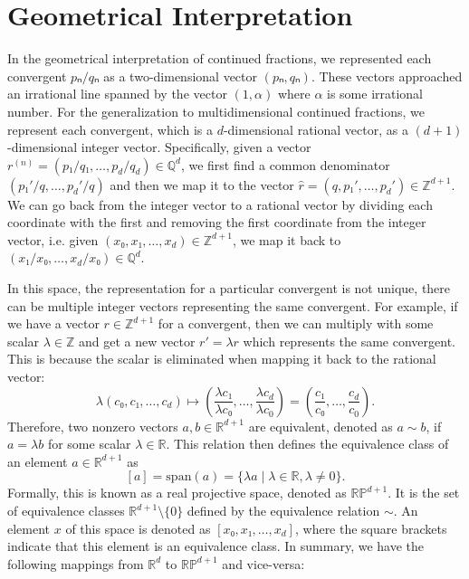 \section{Geometrical Interpretation}
\label{sec:mdcf-geometry}

In the geometrical interpretation of continued fractions,
we represented each convergent $pₙ/qₙ$ as a two-dimensional vector $(pₙ, qₙ)$.
These vectors approached an irrational line spanned by the vector $(1, α)$
where $α$ is some irrational number.
For the generalization to multidimensional continued fractions,
we represent each convergent,
which is a $d$-dimensional rational vector,
as a $(d+1)$-dimensional integer vector.
Specifically, given a vector $r^{(n)} = (p₁/q₁, …, p_d/q_d) ∈ ℚ^d$,
we first find a common denominator $(p₁'/q, …, p_d'/q)$ and
then we map it to the vector $\hat r = (q, p₁', …, p_d') ∈ ℤ^{d+1}$.
We can go back from the integer vector to a rational vector
by dividing each coordinate with the first and
removing the first coordinate from the integer vector,
i.e. given $(x₀, x₁, …, x_d) ∈ ℤ^{d+1}$, we map it back to $(x₁/x₀, …, x_d/x₀) ∈ ℚ^d$.

In this space, the representation for a particular convergent is not unique,
there can be multiple integer vectors representing the same convergent.
For example, if we have a vector $r ∈ ℤ^{d+1}$ for a convergent,
then we can multiply with some scalar $λ ∈ ℤ$ and get a new vector $r' = λ r$
which represents the same convergent.
This is because the scalar is eliminated when mapping it back to the rational vector:
\[
  λ (c₀, c₁, …, c_d)
  ↦ \left(\frac{λ c₁}{λ c₀}, …, \frac{λ c_d}{λ c_0} \right)
  = \left(\frac{c₁}{c₀}, …, \frac{c_d}{c_0} \right).
\]
Therefore, two nonzero vectors $a, b ∈ ℝ^{d+1}$ are equivalent,
denoted as $a \sim b$, if $a = λ b$ for some scalar $λ ∈ ℝ$.
This relation then defines the equivalence class of an element $a ∈ ℝ^{d+1}$ as
\[
  [a] = \mathrm{span}(a) = \{ λ a \mid λ ∈ ℝ, λ ≠ 0 \}.
\]
Formally, this is known as a real projective space, denoted as $\mathbb{RP}^{d+1}$.
It is the set of equivalence classes $ℝ^{d+1} \setminus \{0\}$ defined by the
equivalence relation $\sim$.
An element $x$ of this space is denoted as $[x₀, x₁, …, x_d]$,
where the square brackets indicate that this element is an equivalence
class.
In summary, we have the following mappings from $ℝ^d$ to $\mathbb{RP}^{d+1}$
and vice-versa:

